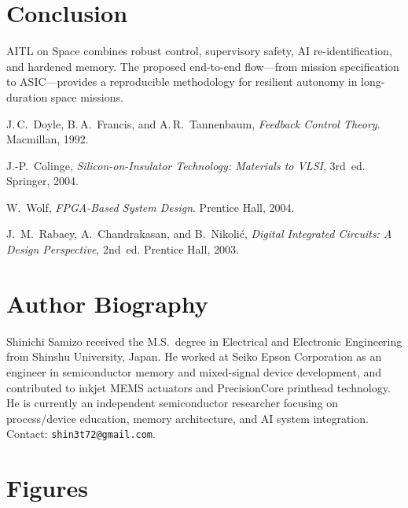 \documentclass[conference]{IEEEtran}
\begin{document}
\section{Conclusion}
AITL on Space combines robust control, supervisory safety, AI re-identification, and hardened memory. The proposed end-to-end flow—from mission specification to ASIC—provides a reproducible methodology for resilient autonomy in long-duration space missions.

\begin{thebibliography}{99}
J.\,C.~Doyle, B.\,A.~Francis, and A.\,R.~Tannenbaum,
\emph{Feedback Control Theory}. Macmillan, 1992.

J.-P.~Colinge, \emph{Silicon-on-Insulator Technology: Materials to VLSI}, 3rd~ed. Springer, 2004.

W.~Wolf, \emph{FPGA-Based System Design}. Prentice Hall, 2004.

J.~M.~Rabaey, A.~Chandrakasan, and B.~Nikoli\'c,
\emph{Digital Integrated Circuits: A Design Perspective}, 2nd~ed. Prentice Hall, 2003.
\end{thebibliography}

\section*{Author Biography}
Shinichi Samizo received the M.S.\ degree in Electrical and Electronic Engineering from Shinshu University, Japan. He worked at Seiko Epson Corporation as an engineer in semiconductor memory and mixed-signal device development, and contributed to inkjet MEMS actuators and PrecisionCore printhead technology. He is currently an independent semiconductor researcher focusing on process/device education, memory architecture, and AI system integration. Contact: \texttt{shin3t72@gmail.com}.

\section*{Figures}
\end{document}
